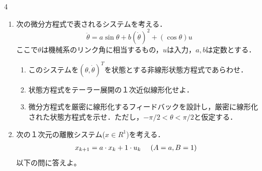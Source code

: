 \documentclass[fleqn]{article}
\begin{document}
\begin{multicols}{4}
\begin{enumerate}
\begin{enumerate}
\item 
$(m_0, m_1, m_2, k_1, k_2)=(1,1,2,2,1)$の場合，可制御であるか否かを判断せよ．
\vspace{9cm}

\item
$(m_0, m_1, m_2, k_1, k_2)=(1,1,2,1,2)$の場合，可制御であるか否かを判断せよ．
\vspace{
9cm}

\end{enumerate}。
\vfill\null
\columnbreak


\item
次の微分方程式で表されるシステムを考える．
\[
	 \ddot{\theta} = a \sin \theta + b (\dot{\theta})^2 + (\cos \theta)u
\]
ここで$\theta$は機械系のリンク角に相当するもの，$u$は入力，$a,b$は定数とする．

\begin{enumerate}
\item 
このシステムを$(\theta, \dot{\theta})^T$を状態とする非線形状態方程式であらわせ．
\vspace{6cm}

\item
状態方程式をテーラー展開の１次近似線形化せよ．
\vspace{10cm}

\item
微分方程式を厳密に線形化するフィードバックを設計し，厳密に線形化された状態方程式を示せ．ただし，$-\pi/2 < \theta < \pi/2$と仮定する．
\vspace{5cm}

\end{enumerate}

\vfill\null
\columnbreak



\item
次の１次元の離散システム($x \in R^1$)を考える．
\vspace{-1mm}
\begin{align}
	x_{k+1} &= a \cdot x_k + 1 \cdot u_k
	\ \ \ \  (A=a, B=1) 
\nonumber
\vspace{-4mm}
\end{align}
以下の問に答えよ。
\vspace{-1mm}



\end{enumerate}
\end{multicols}
\end{document}
